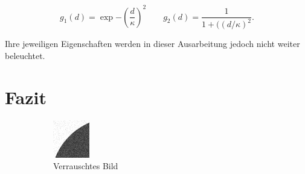 \documentclass[conference]{IEEEtran}
\begin{document}
\begin{equation}
g_1(d) = \exp {- \left( \frac{d}{\kappa} \right)^2}
\qquad
g_2(d) = \frac{1}{1+((d/\kappa)^2}.
\end{equation}

Ihre jeweiligen Eigenschaften werden in dieser Ausarbeitung jedoch nicht weiter beleuchtet.

\section{Fazit}

\begin{figure}
  \begin{subfigure}[b]{0.4\textwidth}
    \includegraphics[width=\linewidth]{img/cut/noisy_circle.png}
    \caption{Verrauschtes Bild}
    \label{fig:1}
  \end{subfigure}
  \begin{subfigure}[b]{0.4\textwidth}

\end{subfigure}
\end{figure}
\end{document}
